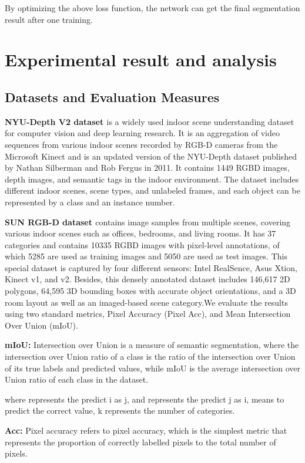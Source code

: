 \documentclass{aims}
\numberwithin{equation}{section}
\begin{document}
By optimizing the above loss function, the network can get the final segmentation result after one training.

\section{Experimental result and analysis}

\subsection{Datasets and Evaluation Measures}
{\bfseries NYU-Depth V2 dataset \cite{silberman2012indoor}} is a widely used indoor scene understanding dataset for computer vision and deep learning research. It is an aggregation of video sequences from various indoor scenes recorded by RGB-D cameras from the Microsoft Kinect and is an updated version of the NYU-Depth dataset published by Nathan Silberman and Rob Fergus in 2011. It contains 1449 RGBD images, depth images, and semantic tags in the indoor environment. The dataset includes different indoor scenes, scene types, and unlabeled frames, and each object can be represented by a class and an instance number.

{\bfseries SUN RGB-D dataset \cite{song2015sun}} contains image samples from multiple scenes, covering various indoor scenes such as offices, bedrooms, and living rooms. It has 37 categories and contains 10335 RGBD images with pixel-level annotations, of which 5285 are used as training images and 5050 are used as test images. This special dataset is captured by four different sensors: Intel RealSence, Asus Xtion, Kinect v1, and v2. Besides, this densely annotated dataset includes 146,617 2D polygons, 64,595 3D bounding boxes with accurate object orientations, and a 3D room layout as well as an imaged-based scene category.We evaluate the results using two standard metrics, Pixel Accuracy (Pixel Acc), and Mean Intersection Over Union (mIoU).

{\bfseries mIoU:} Intersection over Union is a measure of semantic segmentation, where the intersection over Union ratio of a class is the ratio of the intersection over Union of its true labels and predicted values, while mIoU is the average intersection over Union ratio of each class in the dataset.


where  represents the predict i as j, and  represents the predict j as i,  means to predict the correct value, k represents the number of categories.

{\bfseries Acc:} Pixel accuracy refers to pixel accuracy, which is the simplest metric that represents the proportion of correctly labelled pixels to the total number of pixels.
\end{document}
